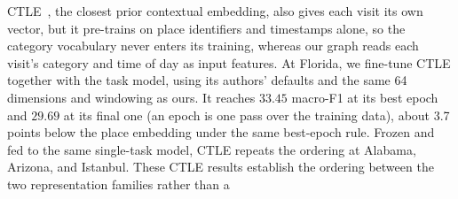 CTLE~\cite{lin2021ctle}, the closest prior contextual embedding, also gives each visit its own vector, but it pre-trains on place identifiers and timestamps alone, so the category vocabulary never enters its training, whereas our graph reads each visit's category and time of day as input features. At Florida, we fine-tune CTLE together with the task model, using its authors' defaults and the same 64 dimensions and windowing as ours. It reaches $33.45$ macro-F1 at its best epoch and $29.69$ at its final one (an epoch is one pass over the training data), about 3.7 points below the place embedding under the same best-epoch rule. Frozen and fed to the same single-task model, CTLE repeats the ordering at Alabama, Arizona, and Istanbul. These CTLE results establish the ordering between the two representation families rather than a
